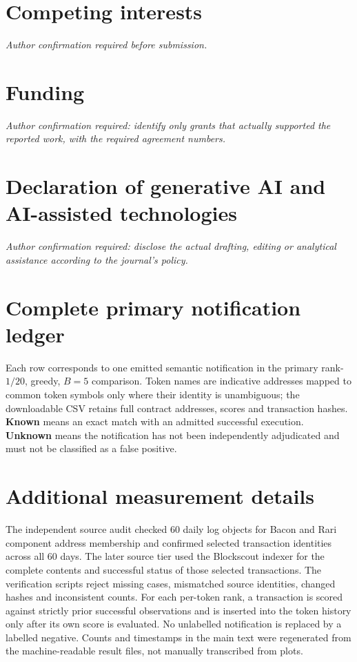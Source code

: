 \documentclass[preprint,12pt,authoryear]{elsarticle}
\begin{document}
\section*{Competing interests}
\textit{Author confirmation required before submission.}
\section*{Funding}
\textit{Author confirmation required: identify only grants that actually supported the reported work, with the required agreement numbers.}
\section*{Declaration of generative AI and AI-assisted technologies}
\textit{Author confirmation required: disclose the actual drafting, editing or analytical assistance according to the journal's policy.}

\appendix
\section{Complete primary notification ledger}\label{app:alerts}
Each row corresponds to one emitted semantic notification in the primary rank-$1/20$, greedy, $B=5$ comparison. Token names are indicative addresses mapped to common token symbols only where their identity is unambiguous; the downloadable CSV retains full contract addresses, scores and transaction hashes. \textbf{Known} means an exact match with an admitted successful execution. \textbf{Unknown} means the notification has not been independently adjudicated and must not be classified as a false positive.



\section{Additional measurement details}\label{app:measurement}
The independent source audit checked 60 daily log objects for Bacon and Rari component address membership and confirmed selected transaction identities across all 60 days. The later source tier used the Blockscout indexer for the complete contents and successful status of those selected transactions. The verification scripts reject missing cases, mismatched source identities, changed hashes and inconsistent counts. For each per-token rank, a transaction is scored against strictly prior successful observations and is inserted into the token history only after its own score is evaluated. No unlabelled notification is replaced by a labelled negative. Counts and timestamps in the main text were regenerated from the machine-readable result files, not manually transcribed from plots.


\begingroup\sloppy\endgroup
\end{document}
